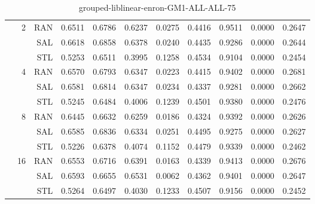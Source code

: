 \begin{center}
\begin{table}[htbp]
\begin{tabular}{ | r | r | r | r | r | r | r | r | r | r | r |}
 & \multirow{3}{*}{2} & RAN & 0.6511 & 0.6786 & 0.6237 & 0.0275 & 0.4416 & 0.9511 & 0.0000 & 0.2647\\ \cline{3-11}
 &   & SAL & 0.6618 & 0.6858 & 0.6378 & 0.0240 & 0.4435 & 0.9286 & 0.0000 & 0.2644\\ \cline{3-11}
 &   & STL & 0.5253 & 0.6511 & 0.3995 & 0.1258 & 0.4534 & 0.9104 & 0.0000 & 0.2454\\ \cline{2-11}
 & \multirow{3}{*}{4} & RAN & 0.6570 & 0.6793 & 0.6347 & 0.0223 & 0.4415 & 0.9402 & 0.0000 & 0.2681\\ \cline{3-11}
 &   & SAL & 0.6581 & 0.6814 & 0.6347 & 0.0234 & 0.4337 & 0.9281 & 0.0000 & 0.2662\\ \cline{3-11}
 &   & STL & 0.5245 & 0.6484 & 0.4006 & 0.1239 & 0.4501 & 0.9380 & 0.0000 & 0.2476\\ \cline{2-11}
 & \multirow{3}{*}{8} & RAN & 0.6445 & 0.6632 & 0.6259 & 0.0186 & 0.4324 & 0.9392 & 0.0000 & 0.2626\\ \cline{3-11}
 &   & SAL & 0.6585 & 0.6836 & 0.6334 & 0.0251 & 0.4495 & 0.9275 & 0.0000 & 0.2627\\ \cline{3-11}
 &   & STL & 0.5226 & 0.6378 & 0.4074 & 0.1152 & 0.4479 & 0.9339 & 0.0000 & 0.2462\\ \cline{2-11}
 & \multirow{3}{*}{16} & RAN & 0.6553 & 0.6716 & 0.6391 & 0.0163 & 0.4339 & 0.9413 & 0.0000 & 0.2676\\ \cline{3-11}
 &   & SAL & 0.6593 & 0.6655 & 0.6531 & 0.0062 & 0.4362 & 0.9401 & 0.0000 & 0.2647\\ \cline{3-11}
 &   & STL & 0.5264 & 0.6497 & 0.4030 & 0.1233 & 0.4507 & 0.9156 & 0.0000 & 0.2452\\ \cline{2-11}
\hline
\end{tabular}
\caption{grouped-liblinear-enron-GM1-ALL-ALL-75}
\end{table}
\end{center}

